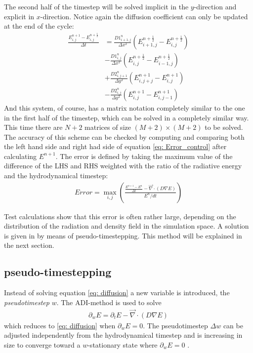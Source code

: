 The second half of the timestep will be solved implicit in the $y$-direction and explicit in $x$-direction. Notice again the diffusion coefficient can only be updated at the end of the cycle:
\begin{align}
\frac{E_{i,j}^{n+1} - E_{i,j}^{n+\frac{1}{2}}}{\Delta t}
 &= \frac{D1_{i+1,j}^{n}}{\Delta x^2} (E_{i+1,j}^{n+\frac{1}{2}} - E_{i,j}^{n+\frac{1}{2}}) \\
 &- \frac{D1_{i,j}^{n}}{\Delta x^2} (E_{i,j}^{n+\frac{1}{2}} - E_{i-1,j}^{n+\frac{1}{2}}) \\
 &+ \frac{D2_{i,j+1}^{n}}{\Delta y^2} (E_{i,j+j}^{n+1} - E_{i,j}^{n+1}) \\
 &- \frac{D2_{i,j}^{n}}{\Delta y^2} (E_{i,j}^{n+1} - E_{i,j-1}^{n+1})
\end{align}
And this system, of course, has a matrix notation completely similar to the one in the first half of the timestep, which can be solved in a completely similar way. This time there are $N+2$ matrices of size $(M+2) \times (M+2)$ to be solved. \\

The accuracy of this scheme can be checked by computing and comparing both the left hand side and right had side of equation \eqref{eq: Error_control} after calculating $E^{n+1}$. The error is defined by taking the maximum value of the difference of the LHS and RHS weighted with the ratio of the radiative energy and the hydrodynamical timestep:
\begin{align}
Error = \max_{i,j} \left(\frac{\frac{E^{n+1} - E^{n}}{\Delta t} -  \vec{\nabla} \cdot \left(D \nabla E\right)}{E^{n}/dt} \right) \label{eq: Error}
\end{align}

 Test calculations show that this error is often rather large, depending on the distribution of the radiation and density field in the simulation space. A solution is given in \cite{Turner12001} by means of pseudo-timestepping. This method will be explained in the next section.
 
 
\subsection{pseudo-timestepping}
Instead of solving equation \eqref{eq: diffusion} a new variable is introduced, the \emph{pseudotimestep} $w$. The ADI-method is used to solve 
\begin{align}
\partial_w E = \partial_t E  - \vec{\nabla} \cdot \left(D \nabla E\right)
\end{align}
which reduces to \eqref{eq: diffusion} when $\partial_w E = 0$. The pseudotimestep $\Delta w$ can be adjusted independently from the hydrodynamical timestep and is increasing in size to converge toward a $w$-stationary state where $\partial_w E = 0$ \cite{Turner12001}.\\

